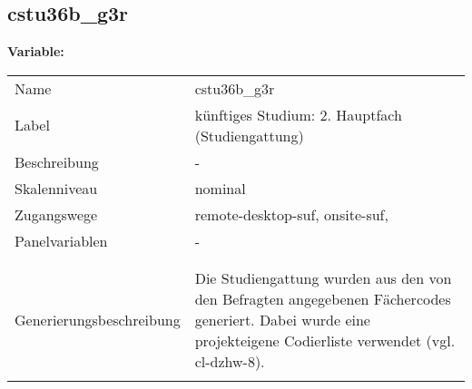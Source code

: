 	
	
	\subsection{cstu36b\_g3r}
	\label{subSection:cstu36b_g3r}

	\noindent\textbf{Variable:}\\
		\begin{tabular}{lL{11.3cm}}
			\label{tableVariable:cstu36b_g3r}
			Name & cstu36b\_g3r \\
			Label & künftiges Studium: 2. Hauptfach (Studiengattung) \\
			Beschreibung & - \\
			Skalenniveau & nominal \\
			Zugangswege &
				remote-desktop-suf,
				onsite-suf,
 \\
			Panelvariablen & -
			 \\
			 \\
 \\
					Generierungsbeschreibung & Die Studiengattung wurden aus den von den Befragten angegebenen Fächercodes generiert.  Dabei wurde eine projekteigene Codierliste verwendet (vgl. cl-dzhw-8).
				 \\	
			 \\
		\end{tabular}






